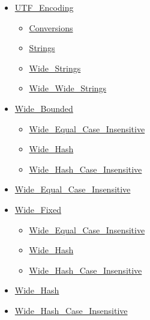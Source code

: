 \documentclass[english]{article}
\begin{document}
\begin{scriptsize}
\begin{multicols*}{5}
\begin{itemize}[leftmargin=0mm]
\begin{itemize}[leftmargin=5mm]
\begin{itemize}[leftmargin=5mm]
\begin{itemize}[leftmargin=5mm]
	  \end{itemize}
	\item[] \href{http://www.ada-auth.org/standards/22rm/html/RM-A-4-11.html}{UTF\_Encoding}
	  \begin{itemize}[leftmargin=5mm]
	  \item[] \href{http://www.ada-auth.org/standards/22rm/html/RM-A-4-11.html}{Conversions}
	  \item[] \href{http://www.ada-auth.org/standards/22rm/html/RM-A-4-11.html}{Strings}
	  \item[] \href{http://www.ada-auth.org/standards/22rm/html/RM-A-4-11.html}{Wide\_Strings}
	  \item[] \href{http://www.ada-auth.org/standards/22rm/html/RM-A-4-11.html}{Wide\_Wide\_Strings}
	  \end{itemize}
	\item[] \href{http://www.ada-auth.org/standards/22rm/html/RM-A-4-7.html}{Wide\_Bounded}
	  \begin{itemize}[leftmargin=5mm]
	  \item[] \href{http://www.ada-auth.org/standards/22rm/html/RM-A-4-7.html}{Wide\_Equal\_Case\_Insensitive}
	  \item[] \href{http://www.ada-auth.org/standards/22rm/html/RM-A-4-7.html}{Wide\_Hash}
	  \item[] \href{http://www.ada-auth.org/standards/22rm/html/RM-A-4-7.html}{Wide\_Hash\_Case\_Insensitive}
	  \end{itemize}
	\item[] \href{http://www.ada-auth.org/standards/22rm/html/RM-A-4-7.html}{Wide\_Equal\_Case\_Insensitive}
	\item[] \href{http://www.ada-auth.org/standards/22rm/html/RM-A-4-7.html}{Wide\_Fixed}
	  \begin{itemize}[leftmargin=5mm]
	  \item[] \href{http://www.ada-auth.org/standards/22rm/html/RM-A-4-7.html}{Wide\_Equal\_Case\_Insensitive}
	  \item[] \href{http://www.ada-auth.org/standards/22rm/html/RM-A-4-7.html}{Wide\_Hash}
	  \item[] \href{http://www.ada-auth.org/standards/22rm/html/RM-A-4-7.html}{Wide\_Hash\_Case\_Insensitive}
	  \end{itemize}
	\item[] \href{http://www.ada-auth.org/standards/22rm/html/RM-A-4-7.html}{Wide\_Hash}
	\item[] \href{http://www.ada-auth.org/standards/22rm/html/RM-A-4-7.html}{Wide\_Hash\_Case\_Insensitive}

\end{itemize}
\end{itemize}
\end{itemize}
\end{multicols*}
\end{scriptsize}
\end{document}
